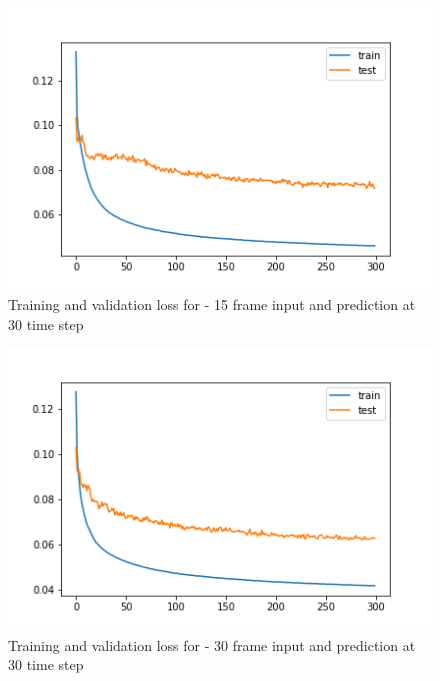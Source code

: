 \begin{figure}[H]
\includegraphics[scale=1.0]{conf8_300e_30ffuture}
\begin{center}
\caption{Training and validation loss for - 15 frame input and prediction at 30 time step }
\end{center}
\end{figure}

\begin{figure}[H]
\includegraphics[scale=1.0]{conf10_300e_30ffuture}
\begin{center}
\caption{Training and validation loss for - 30 frame input and prediction at 30 time step }
\end{center}
\end{figure}

